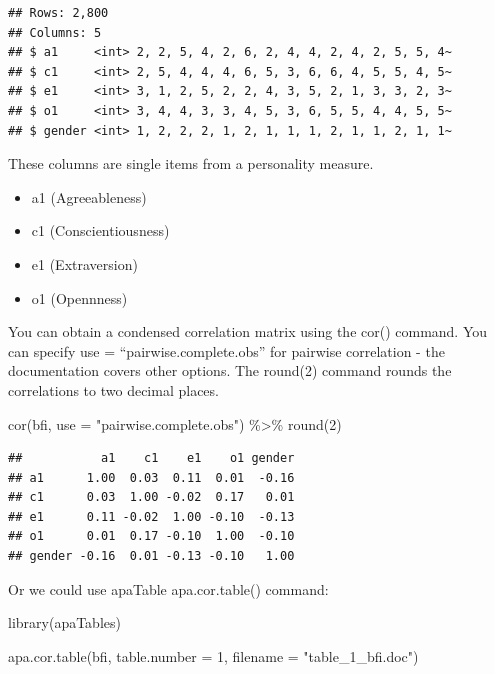 \documentclass[
]{krantz}
\makeatletter
\newenvironment{Shaded}{\begin{snugshade}}{\end{snugshade}}
\newcommand{\AttributeTok}[1]{\textcolor[rgb]{0.61,0.61,0.61}{#1}}
\newcommand{\DecValTok}[1]{\textcolor[rgb]{0.06,0.06,0.06}{#1}}
\newcommand{\FunctionTok}[1]{\textcolor[rgb]{0,0,0}{#1}}
\newcommand{\NormalTok}[1]{#1}
\newcommand{\SpecialCharTok}[1]{\textcolor[rgb]{0,0,0}{#1}}
\newcommand{\StringTok}[1]{\textcolor[rgb]{0.5,0.5,0.5}{#1}}
\newenvironment{kframe}{%
\medskip{}
\setlength{\fboxsep}{.8em}
 \def\at@end@of@kframe{}%
 \ifinner\ifhmode%
  \def\at@end@of@kframe{\end{minipage}}%
  \begin{minipage}{\columnwidth}%
 \fi\fi%
 \def\FrameCommand##1{\hskip\@totalleftmargin \hskip-\fboxsep
 \colorbox{shadecolor}{##1}\hskip-\fboxsep
     \hskip-\linewidth \hskip-\@totalleftmargin \hskip\columnwidth}%
 \MakeFramed {\advance\hsize-\width
   \@totalleftmargin\z@ \linewidth\hsize
   \@setminipage}}%
 {\par\unskip\endMakeFramed%
 \at@end@of@kframe}
\renewenvironment{Shaded}{\begin{kframe}}{\end{kframe}}
\makeatother
\begin{document}
\begin{verbatim}
## Rows: 2,800
## Columns: 5
## $ a1     <int> 2, 2, 5, 4, 2, 6, 2, 4, 4, 2, 4, 2, 5, 5, 4~
## $ c1     <int> 2, 5, 4, 4, 4, 6, 5, 3, 6, 6, 4, 5, 5, 4, 5~
## $ e1     <int> 3, 1, 2, 5, 2, 2, 4, 3, 5, 2, 1, 3, 3, 2, 3~
## $ o1     <int> 3, 4, 4, 3, 3, 4, 5, 3, 6, 5, 5, 4, 4, 5, 5~
## $ gender <int> 1, 2, 2, 2, 1, 2, 1, 1, 1, 2, 1, 1, 2, 1, 1~
\end{verbatim}

These columns are single items from a personality measure.

\begin{itemize}
\item
  a1 (Agreeableness)
\item
  c1 (Conscientiousness)
\item
  e1 (Extraversion)
\item
  o1 (Opennness)
\end{itemize}

You can obtain a condensed correlation matrix using the cor() command. You can specify use = ``pairwise.complete.obs'' for pairwise correlation - the documentation covers other options. The round(2) command rounds the correlations to two decimal places.

\begin{Shaded}
\begin{Highlighting}[]
\FunctionTok{cor}\NormalTok{(bfi, }\AttributeTok{use =} \StringTok{"pairwise.complete.obs"}\NormalTok{) }\SpecialCharTok{\%\textgreater{}\%}
    \FunctionTok{round}\NormalTok{(}\DecValTok{2}\NormalTok{)}
\end{Highlighting}
\end{Shaded}

\begin{verbatim}
##           a1    c1    e1    o1 gender
## a1      1.00  0.03  0.11  0.01  -0.16
## c1      0.03  1.00 -0.02  0.17   0.01
## e1      0.11 -0.02  1.00 -0.10  -0.13
## o1      0.01  0.17 -0.10  1.00  -0.10
## gender -0.16  0.01 -0.13 -0.10   1.00
\end{verbatim}

Or we could use apaTable apa.cor.table() command:

\begin{Shaded}
\begin{Highlighting}[]
\FunctionTok{library}\NormalTok{(apaTables)}

\FunctionTok{apa.cor.table}\NormalTok{(bfi,}
              \AttributeTok{table.number =} \DecValTok{1}\NormalTok{,}
              \AttributeTok{filename =} \StringTok{"table\_1\_bfi.doc"}\NormalTok{)}
\end{Highlighting}
\end{Shaded}
\end{document}

